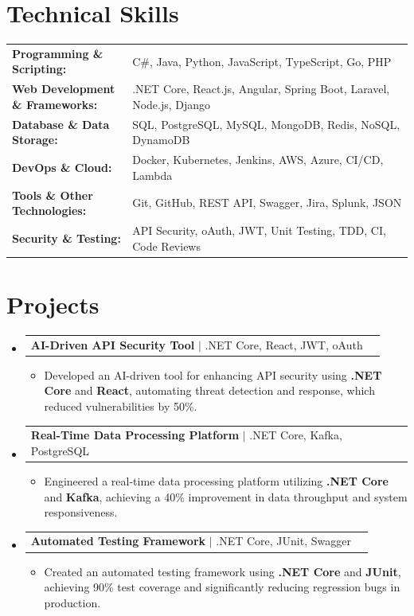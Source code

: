 \documentclass[letterpaper,10pt]{article}
\makeatletter
\newcommand{\resumeItem}[1]{
  \item{\fontsize{8pt}{9pt}\selectfont
    #1 \vspace{-3pt}
  }
}
\newcommand{\resumeProjectHeading}[2]{
    \item
    \begin{tabular*}{1.001\textwidth}{l@{\extracolsep{\fill}}r}
      \fontsize{8.5pt}{10pt}#1 & \textbf{\fontsize{8.5pt}{10pt} #2}\\
    \end{tabular*}\vspace{-7pt}
}
\newcommand{\resumeSubHeadingListStart}{\begin{itemize}[leftmargin=0pt, label={}]}
\newcommand{\resumeSubHeadingListEnd}{\end{itemize}}
\newcommand{\resumeItemListStart}{\begin{itemize}[leftmargin=*]}
\newcommand{\resumeItemListEnd}{\end{itemize}\vspace{-5pt}}
\makeatother
\begin{document}
\section{Technical Skills}
        \vspace{-14pt}
        \begin{table}[h]
            \fontsize{8pt}{9pt}\selectfont
            \begin{tabular}{p{0.3\linewidth} p{0.7\linewidth}}
                \textbf{Programming \& Scripting:} & C\#, Java, Python, JavaScript, TypeScript, Go, PHP \\
                \textbf{Web Development \& Frameworks:} & .NET Core, React.js, Angular, Spring Boot, Laravel, Node.js, Django \\
                \textbf{Database \& Data Storage:} & SQL, PostgreSQL, MySQL, MongoDB, Redis, NoSQL, DynamoDB \\
                \textbf{DevOps \& Cloud:} & Docker, Kubernetes, Jenkins, AWS, Azure, CI/CD, Lambda \\
                \textbf{Tools \& Other Technologies:} & Git, GitHub, REST API, Swagger, Jira, Splunk, JSON \\
                \textbf{Security \& Testing:} & API Security, oAuth, JWT, Unit Testing, TDD, CI, Code Reviews \\
            \end{tabular}
        \end{table}
 \vspace{-18pt}

\section{Projects}
    \vspace{-5pt}
    \resumeSubHeadingListStart
          \resumeProjectHeading
            {\textbf{AI-Driven API Security Tool} $|$ .NET Core, React, JWT, oAuth}{}
            \resumeItemListStart
                \resumeItem{Developed an AI-driven tool for enhancing API security using \textbf{.NET Core} and \textbf{React}, automating threat detection and response, which reduced vulnerabilities by 50\%.}
            \resumeItemListEnd
        \vspace{-12pt}
    
        \resumeProjectHeading
            {\textbf{Real-Time Data Processing Platform} $|$ .NET Core, Kafka, PostgreSQL}{}
        \resumeItemListStart
                \resumeItem{Engineered a real-time data processing platform utilizing \textbf{.NET Core} and \textbf{Kafka}, achieving a 40\% improvement in data throughput and system responsiveness.}
        \resumeItemListEnd
      \vspace{-12pt}
      \resumeProjectHeading
        {\textbf{Automated Testing Framework} $|$ .NET Core, JUnit, Swagger}{}
    \resumeItemListStart
            \resumeItem{Created an automated testing framework using \textbf{.NET Core} and \textbf{JUnit}, achieving 90\% test coverage and significantly reducing regression bugs in production.}
    \resumeItemListEnd
    \resumeSubHeadingListEnd
\end{document}
